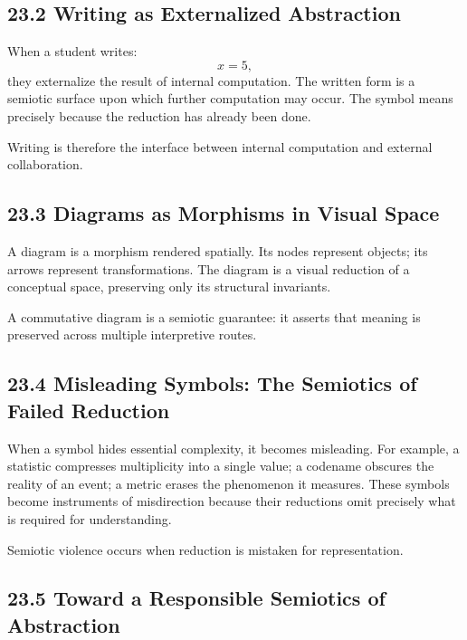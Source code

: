 \documentclass[12pt,letterpaper]{article}
\theoremstyle{remark}
\begin{document}
\subsection{23.2 Writing as Externalized Abstraction}

When a student writes:
\[
x = 5,
\]
they externalize the result of internal computation. The written form is a semiotic surface upon which further computation may occur. The symbol means precisely because the reduction has already been done.

Writing is therefore the interface between internal computation and external collaboration.

\subsection{23.3 Diagrams as Morphisms in Visual Space}

A diagram is a morphism rendered spatially. Its nodes represent objects; its arrows represent transformations. The diagram is a visual reduction of a conceptual space, preserving only its structural invariants.

A commutative diagram is a semiotic guarantee: it asserts that meaning is preserved across multiple interpretive routes.

\subsection{23.4 Misleading Symbols: The Semiotics of Failed Reduction}

When a symbol hides essential complexity, it becomes misleading. For example, a statistic compresses multiplicity into a single value; a codename obscures the reality of an event; a metric erases the phenomenon it measures. These symbols become instruments of misdirection because their reductions omit precisely what is required for understanding.

Semiotic violence occurs when reduction is mistaken for representation.

\subsection{23.5 Toward a Responsible Semiotics of Abstraction}
\end{document}
